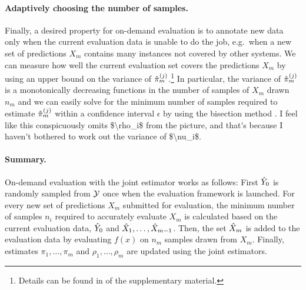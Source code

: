 \paragraph{Adaptively choosing the number of samples.}
Finally, a desired property for on-demand evaluation is to annotate new data only when the current evaluation data is unable to do the job, e.g.\ when a new set of predictions $X_m$ contains many instances not covered by other systems.
We can measure how well the current evaluation set covers the predictions $X_m$ by using an upper bound on the variance of ${\hat{\pi}}_m^{(j)}$.\footnote{Details can be found in  of the supplementary material.}
In particular, the variance of ${\hat{\pi}}_m^{(j)}$ is a monotonically decreasing functions in the number of samples of $X_m$ drawn $n_m$ and we can easily solve for the minimum number of samples required to estimate ${\hat{\pi}}_m^{(j)}$ within a confidence interval $\epsilon$ by using the bisection method \citep{burden1985bisection}. \ac{I feel like this conspicuously omits $\rho_i$ from the picture, and that's because I haven't bothered to work out the variance of $\nu_i$.}

\paragraph{Summary.}
On-demand evaluation with the joint estimator works as follows:
First ${\hat{Y}}_0$ is randomly sampled from $\mathcal{Y}$ once when the evaluation framework is launched.
For every new set of predictions $X_m$ submitted for evaluation, the minimum number of samples $n_i$ required to accurately evaluate $X_m$ is calculated based on the current evaluation data, ${\hat{Y}}_0$ and ${\hat{X}}_1, \ldots, {\hat{X}}_{m-1}$.
Then, the set ${\hat{X}}_m$ is added to the evaluation data by evaluating $f(x)$ on $n_m$ samples drawn from $X_m$.
Finally, estimates $\pi_1, \ldots, \pi_m$ and $\rho_1, \ldots, \rho_m$ are updated using the joint estimators.
